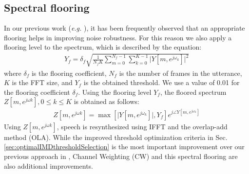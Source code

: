 \documentclass{article}
\begin{document}
\subsection{Spectral flooring}
\label{sec:spectral_flooring}
%
In our previous work (\emph{e.g.}  \cite{C_Kim_IEEETran_2016_1} ), it has been frequently observed that an appropriate flooring helps in improving 
  noise robustness. For this reason we also
apply a flooring level to the spectrum, which is described by the   equation:
\begin{align}
Y_{f} = \delta_f \sqrt{\frac{1}{N_f K}  \sum_{m=0}^{N_f - 1} \sum_{k = 0}^{K - 1}  \big|Y[m, e^{j \omega_k}]\big|^2 }
\end{align}
where $\delta_f$ is the flooring coefficient, $N_f$ is the number of frames in the utterance,  $K$
is the FFT size, and $Y_{f}$ is the obtained threshold. We use a value of 0.01 for the flooring
coefficient $\delta_f$.
Using the flooring level $Y_{f}$, the floored spectrum $Z [m, e^{j \omega k}], 0 \le k \le K$ is obtained as follows:
	\begin{align}
    Z[m, e^{j \omega k}] =  \max\left[  \big| Y[m, e^{j \omega_k}] \big|
     , Y_f\right] e^ {j \angle Y[m, e^{j \omega_k}] }
	\end{align}
Using $Z [m, e^{j \omega k}]$, speech is resynthesized using IFFT and the
overlap-add method (OLA). While the improved threshold optimization 
criteria in Sec. \ref{sec:optimalIMDthresholdSelection} is the most important 
improvement over our previous approach in \cite{C_Kim_INTERSPEECH_2010_1},
Channel Weighting (CW) and this spectral flooring are also additional
improvements.
\end{document}
